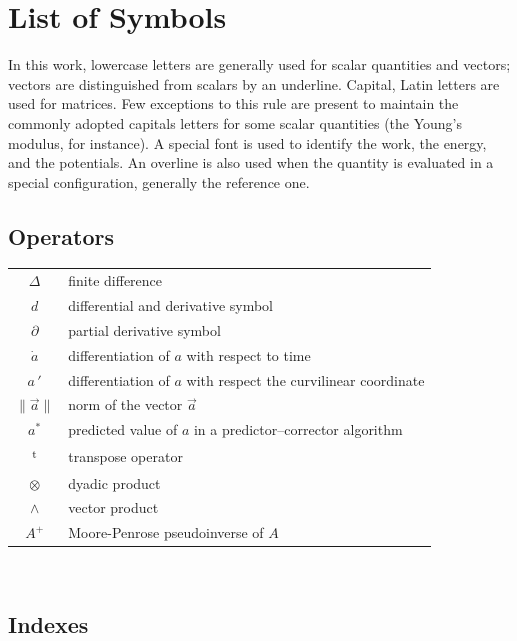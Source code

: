 \chapter*{List of Symbols}

In this work, lowercase letters are generally used for scalar quantities and vectors; vectors are distinguished from scalars by an underline. Capital, Latin letters are used for matrices. Few exceptions to this rule are present to maintain the commonly adopted capitals letters for some scalar quantities (the Young's modulus, for instance). A special font is used to identify the work, the energy, and the potentials. An overline is also used when the quantity is evaluated in a special configuration, generally the reference one.

\section*{Operators}

\begin{tabular}{cp{}}

    $\Delta$        & finite difference \\
    $d$             & differential and derivative symbol  \\
    $\partial$      & partial derivative symbol \\
    $\dot{a}$       & differentiation of $a$ with respect to time \\
    $a \, '$        & differentiation of $a$ with respect the curvilinear coordinate \\
    $\| \vec{a} \|$ & norm of the vector $\vec{a}$ \\
    $ a^* $         & predicted value of $a$ in a predictor--corrector algorithm \\
    \textsuperscript{t} & transpose operator \\
    $\otimes$       & dyadic product \\
    $\wedge$        & vector product \\
    $ A^{+} $       & Moore-Penrose pseudoinverse of $ A $
\end{tabular}\\

\section*{Indexes}

